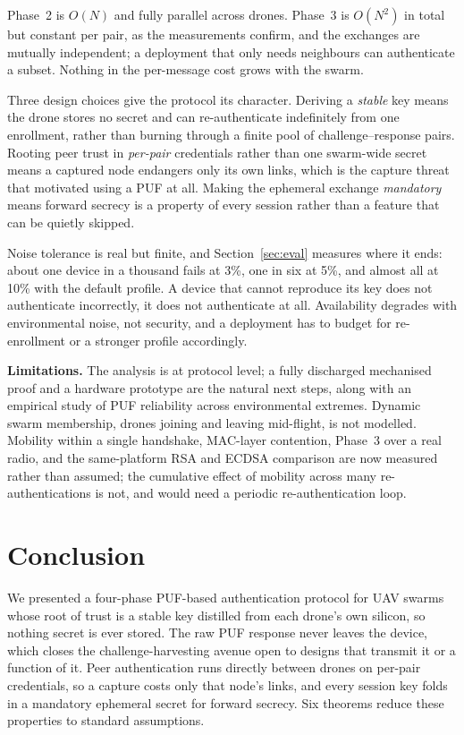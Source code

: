 \documentclass[conference]{IEEEtran}
\begin{document}
Phase~2 is $O(N)$ and fully parallel across drones. Phase~3 is $O(N^2)$ in total
but constant per pair, as the measurements confirm, and the exchanges are
mutually independent; a deployment that only needs neighbours can authenticate a
subset. Nothing in the per-message cost grows with the swarm.

Three design choices give the protocol its character. Deriving a \emph{stable}
key means the drone stores no secret and can re-authenticate indefinitely from
one enrollment, rather than burning through a finite pool of challenge--response
pairs. Rooting peer trust in \emph{per-pair} credentials rather than one
swarm-wide secret means a captured node endangers only its own links, which is
the capture threat that motivated using a PUF at all. Making the ephemeral
exchange \emph{mandatory} means forward secrecy is a property of every session
rather than a feature that can be quietly skipped.

Noise tolerance is real but finite, and Section~\ref{sec:eval} measures where it
ends: about one device in a thousand fails at 3\%, one in six at 5\%, and almost
all at 10\% with the default profile. A device that cannot reproduce its key
does not authenticate incorrectly, it does not authenticate at all. Availability
degrades with environmental noise, not security, and a deployment has to budget
for re-enrollment or a stronger profile accordingly.

\textbf{Limitations.} The analysis is at protocol level; a fully discharged
mechanised proof and a hardware prototype are the natural next steps, along with
an empirical study of PUF reliability across environmental extremes. Dynamic
swarm membership, drones joining and leaving mid-flight, is not modelled.
Mobility within a single handshake, MAC-layer contention, Phase~3 over a real
radio, and the same-platform RSA and ECDSA comparison are now measured rather
than assumed; the cumulative effect of mobility across many re-authentications
is not, and would need a periodic re-authentication loop.

\section{Conclusion}

We presented a four-phase PUF-based authentication protocol for UAV swarms whose
root of trust is a stable key distilled from each drone's own silicon, so
nothing secret is ever stored. The raw PUF response never leaves the device,
which closes the challenge-harvesting avenue open to designs that transmit it or
a function of it. Peer authentication runs directly between drones on per-pair
credentials, so a capture costs only that node's links, and every session key
folds in a mandatory ephemeral secret for forward secrecy. Six theorems reduce
these properties to standard assumptions.
\end{document}
